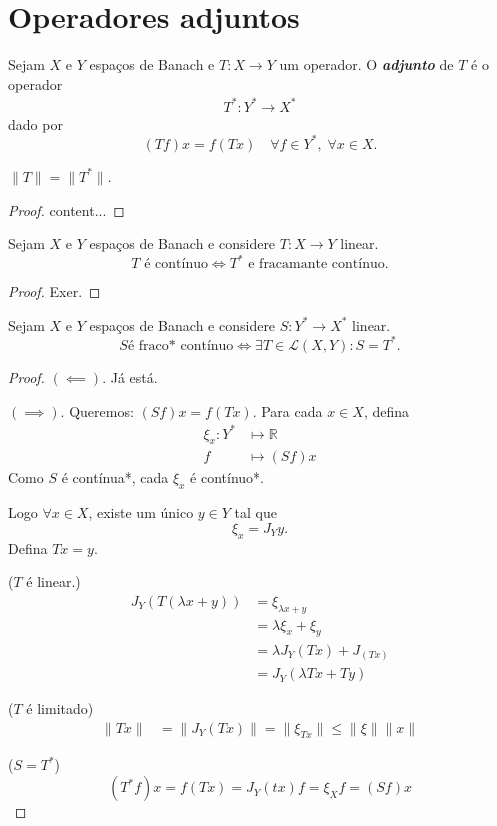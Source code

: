 \documentclass[portuguese]{article}
\theoremstyle{definition}
\newcommand{\R}{\mathbb{R}}
\begin{document}
\section{Operadores adjuntos}
\begin{defn}
	Sejam $X$ e $Y$ espaços de Banach e $T:X\to Y$ um operador. O \textbf{\textit{adjunto}} de $T$ é o operador
	\begin{align*}
		T^*:Y^*\to X^*
	\end{align*}
	dado por
	\[(Tf)x=f(Tx)\quad\forall f\in Y^*,\;\forall x\in X.\]
\end{defn}
\begin{exer*}
	{\color{orange}$\|T\|=\|T^*\|$.}
\end{exer*}
\begin{proof}
	content...
\end{proof}
\begin{prop}
	Sejam $X$ e $Y$ espaços de Banach e considere $T:X\to Y$ linear.
	\[T\text{ é contínuo}\iff T^*\text{ e fracamante contínuo}.\]
\end{prop}
\begin{proof}
	{\color{orange}Exer.}
\end{proof}
\begin{prop}
	Sejam $X$ e $Y$ espaços de Banach e considere $S:Y^*\to X^*$ linear.
	\[S\text{é fraco* contínuo}\iff\exists T\in\mathcal{L}(X,Y):S=T^*.\]
\end{prop}
\begin{proof}
	$(\impliedby)$. Já está.
	
	$(\implies)$. Queremos: $(Sf)x=f(Tx)$. Para cada $x\in X$, defina
	\begin{align*}
		\xi_x:Y^*&\mapsto \R\\
		f&\mapsto (Sf)x
	\end{align*}
	Como $S$ é contínua*, cada $\xi_x$ é contínuo*.
	
	Logo $\forall x\in X$, existe um único $y\in Y$ tal que
	\[\xi_x=J_Yy.\]
	Defina $Tx=y$.
	
	($T$ é linear.)\begin{align*}
		J_Y(T(\lambda x+y))&=\xi_{\lambda x+y}\\
		&=\lambda\xi_x+\xi_y\\
		&=\lambda J_Y(Tx)+J_(Tx)\\
		&=J_Y(\lambda Tx+Ty)
	\end{align*}
	
	($T$ é limitado)\begin{align*}
		\|Tx\|&=\|J_Y(Tx)\|=\|\xi_{Tx}\|\leq\|\xi\|\|x\|
	\end{align*}
	
	($S=T^*$) \[(T^*f)x=f(Tx)=J_Y(tx)f=\xi_Xf=(Sf)x\]
\end{proof}
\end{document}

